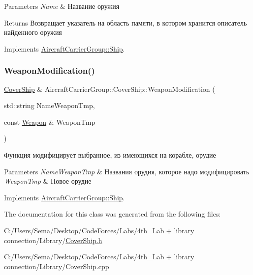 \begin{DoxyParams}{Parameters}
{\em Name} & Название оружия \\
\hline
\end{DoxyParams}
\begin{DoxyReturn}{Returns}
Возвращает указатель на область памяти, в котором хранится описатель найденного оружия 
\end{DoxyReturn}


Implements \mbox{\hyperlink{class_aircraft_carrier_group_1_1_ship_a8ac6e8e9ed4f997a5f02fda7e049cd6d}{Aircraft\+Carrier\+Group\+::\+Ship}}.

\mbox{\label{class_aircraft_carrier_group_1_1_cover_ship_a135b4e20acbdb6bfbcb2cbb6df855d09}} 
\subsubsection{\texorpdfstring{Weapon\+Modification()}{WeaponModification()}}
{\footnotesize\ttfamily \mbox{\hyperlink{class_aircraft_carrier_group_1_1_cover_ship}{Cover\+Ship}} \& Aircraft\+Carrier\+Group\+::\+Cover\+Ship\+::\+Weapon\+Modification (\begin{DoxyParamCaption}\item[{std\+::string}]{Name\+Weapon\+Tmp,  }\item[{const \mbox{\hyperlink{class_aircraft_carrier_group_1_1_weapon}{Weapon}} \&}]{Weapon\+Tmp }\end{DoxyParamCaption})\hspace{0.3cm}{\ttfamily [virtual]}}



Функция модифицирует выбранное, из имеющихся на корабле, орудие 


\begin{DoxyParams}{Parameters}
{\em Name\+Weapon\+Tmp} & Названия орудия, которое надо модифицировать \\
\hline
{\em Weapon\+Tmp} & Новое орудие \\
\hline
\end{DoxyParams}


Implements \mbox{\hyperlink{class_aircraft_carrier_group_1_1_ship_a3f91c1ad2960c095cfd88e85df0a3990}{Aircraft\+Carrier\+Group\+::\+Ship}}.



The documentation for this class was generated from the following files\+:\begin{DoxyCompactItemize}
\item 
C\+:/\+Users/\+Sema/\+Desktop/\+Code\+Forces/\+Labs/4th\+\_\+\+Lab + library connection/\+Library/\mbox{\hyperlink{_cover_ship_8h}{Cover\+Ship.\+h}}\item 
C\+:/\+Users/\+Sema/\+Desktop/\+Code\+Forces/\+Labs/4th\+\_\+\+Lab + library connection/\+Library/Cover\+Ship.\+cpp\end{DoxyCompactItemize}
